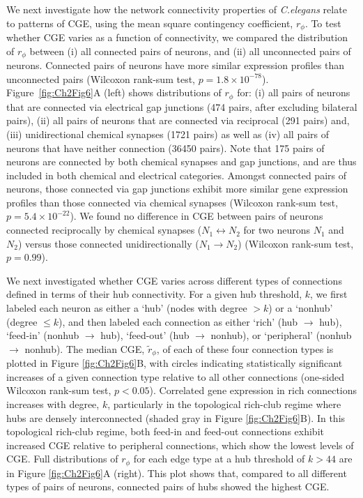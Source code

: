 We next investigate how the network connectivity properties of \emph{C.elegans} relate to patterns of CGE, using the mean square contingency coefficient, $r_\phi$.
To test whether CGE varies as a function of connectivity, we compared the distribution of $r_\phi$ between
(i) all connected pairs of neurons, and
(ii) all unconnected pairs of neurons.
Connected pairs of neurons have more similar expression profiles than unconnected pairs (Wilcoxon rank-sum test, $p = 1.8 \times 10^{-78}$).
Figure~\ref{fig:Ch2Fig6}A (left) shows distributions of $r_\phi$ for:
(i) all pairs of neurons that are connected via electrical gap junctions (474 pairs, after excluding bilateral pairs),
(ii) all pairs of neurons that are connected via reciprocal (291 pairs) and,
(iii) unidirectional chemical synapses (1721 pairs) as well as
(iv) all pairs of neurons that have neither connection (\num{36450} pairs).
Note that 175 pairs of neurons are connected by both chemical synapses and gap junctions, and are thus included in both chemical and electrical categories.
Amongst connected pairs of neurons, those connected via gap junctions exhibit more similar gene expression profiles than those connected via chemical synapses (Wilcoxon rank-sum test, $p = 5.4 \times 10^{-22}$).
We found no difference in CGE between pairs of neurons connected reciprocally by chemical synapses ($N_1 \leftrightarrow N_2$ for two neurons $N_1$ and $N_2$) versus those connected unidirectionally ($N_1 \rightarrow N_2$) (Wilcoxon rank-sum test, $p = 0.99$).

We next investigated whether CGE varies across different types of connections defined in terms of their hub connectivity.
For a given hub threshold, $k$, we first labeled each neuron as either a `hub' (nodes with degree $> k$) or a `nonhub' (degree $\leq k$), and then labeled each connection as either `rich' (hub $\rightarrow$ hub), `feed-in' (nonhub $\rightarrow$ hub), `feed-out' (hub $\rightarrow$ nonhub), or `peripheral' (nonhub $\rightarrow$ nonhub).
The median CGE, $\tilde{r}_\phi$, of each of these four connection types is plotted in Figure \ref{fig:Ch2Fig6}B, with circles indicating statistically significant increases of a given connection type relative to all other connections (one-sided Wilcoxon rank-sum test, $p < 0.05$).
Correlated gene expression in rich connections increases with degree, $k$, particularly in the topological rich-club regime where hubs are densely interconnected (shaded gray in Figure \ref{fig:Ch2Fig6}B).
In this topological rich-club regime, both feed-in and feed-out connections exhibit increased CGE relative to peripheral connections, which show the lowest levels of CGE.
Full distributions of $r_\phi$ for each edge type at a hub threshold of $k > 44$ are in Figure \ref{fig:Ch2Fig6}A (right).
This plot shows that, compared to all different types of pairs of neurons, connected pairs of hubs showed the highest CGE.

